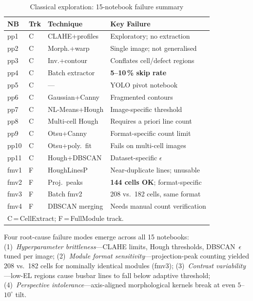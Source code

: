 \documentclass[conference]{IEEEtran}
\begin{document}
\begin{table}[t]
  \caption{Classical exploration: 15-notebook failure summary}
  \label{tab:classical_all}
  \begin{center}
  \renewcommand{\arraystretch}{1.0}\scriptsize
  \begin{tabular}{p{0.55cm}p{0.35cm}p{1.65cm}p{3.55cm}}
    \toprule
    \textbf{NB} & \textbf{Trk} & \textbf{Technique} & \textbf{Key Failure}\\
    \midrule
    pp1  & C & CLAHE+profiles   & Exploratory; no extraction\\
    pp2  & C & Morph.+warp      & Single image; not generalised\\
    pp3  & C & Inv.+contour     & Conflates cell/defect regions\\
    pp4  & C & Batch extractor  & \textbf{5--10\,\% skip rate}\\
    pp5  & C & ---              & YOLO pivot notebook\\
    pp6  & C & Gaussian+Canny   & Fragmented contours\\
    pp7  & C & NL-Means+Hough   & Image-specific threshold\\
    pp8  & C & Multi-cell Hough & Requires a priori line count\\
    pp9  & C & Otsu+Canny       & Format-specific count limit\\
    pp10 & C & Otsu+poly.\ fit  & Fails on multi-cell images\\
    pp11 & C & Hough+DBSCAN     & Dataset-specific $\epsilon$\\
    \midrule
    fmv1 & F & HoughLinesP      & Near-duplicate lines; unusable\\
    fmv2 & F & Proj.\ peaks     & \textbf{144 cells OK}; format-specific\\
    fmv3 & F & Batch fmv2       & 208 vs.\ 182 cells, same format\\
    fmv4 & F & DBSCAN merging   & Needs manual count verification\\
    \bottomrule
    \multicolumn{4}{l}{\scriptsize C\,=\,CellExtract; F\,=\,FullModule track.}
  \end{tabular}
  \end{center}
\end{table}

Four root-cause failure modes emerge across all 15 notebooks: (1)~\textit{Hyperparameter brittleness}---CLAHE limits, Hough thresholds, DBSCAN~$\epsilon$ tuned per image; (2)~\textit{Module format sensitivity}---projection-peak counting yielded 208 vs.\ 182 cells for nominally identical modules (fmv3); (3)~\textit{Contrast variability}---low-EL regions cause busbar lines to fall below adaptive threshold; (4)~\textit{Perspective intolerance}---axis-aligned morphological kernels break at even $5$--$10^\circ$ tilt.
\end{document}
